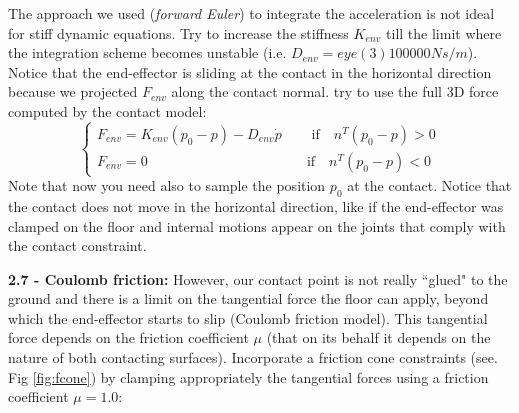 \documentclass[11pt]{article}
\begin{document}
The approach we used (\textit{forward Euler}) to integrate the acceleration is not ideal for stiff dynamic equations. Try to increase the stiffness $K_{env}$ till the limit where the integration scheme becomes unstable (i.e. $D_{env} = eye(3)100000 Ns/m$).
Notice that the end-effector is  sliding at the contact in the horizontal direction because we projected $F_{env}$ along the contact normal.
try to use the full 3D force computed by the contact model:
%
\begin{equation*}
\begin{cases}
F_{env} = K_{env}(p_0 - p) - D_{env} \dot{p} \quad &\text{   if}\quad n^T(p_0 -p ) >0 \\ 
F_{env} = 0     \quad &\text{if}\quad n^T(p_0 -p ) <0
\end{cases}
\end{equation*}
%
Note that now you need also to sample the position $p_0$ at the contact.
Notice that the contact does not move in the horizontal direction, like if the end-effector was clamped on the floor and internal motions appear on the joints that comply with the contact constraint. 

\quad

\noindent
\textbf{ 2.7 - Coulomb friction:} 
However, our contact point is not really ``glued" to the ground and there is a limit on the tangential force the floor can apply,  
beyond which the end-effector starts to slip (Coulomb friction model).  This tangential force depends on the friction coefficient $\mu$ (that on its behalf it depends on the nature of both contacting surfaces). Incorporate a friction cone constraints (see. Fig \ref{fig:fcone}) by clamping  appropriately the tangential forces using  a friction coefficient $\mu = 1.0$:
\end{document}
